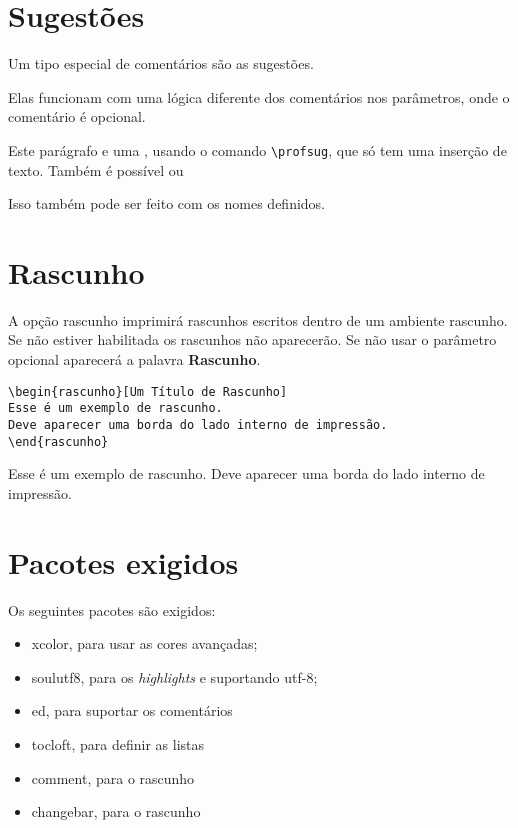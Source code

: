 \documentclass{article}
\begin{document}
\section{Sugestões}

Um tipo especial de comentários são as sugestões.

Elas funcionam com uma lógica diferente dos comentários nos parâmetros, onde o comentário é opcional.

Este parágrafo  e 
uma , usando o comando \verb*|\profsug|, que só tem uma inserção de texto. Também é possível  ou 

Isso também pode ser feito com os nomes definidos. 




\section{Rascunho}

A opção rascunho imprimirá rascunhos escritos dentro de um ambiente rascunho. Se não estiver habilitada os rascunhos não aparecerão. Se não usar o parâmetro opcional aparecerá a palavra \textbf{Rascunho}. 

\begin{verbatim}
\begin{rascunho}[Um Título de Rascunho]
Esse é um exemplo de rascunho. 
Deve aparecer uma borda do lado interno de impressão.
\end{rascunho}
\end{verbatim}

\begin{rascunho}
Esse é um exemplo de rascunho. 
Deve aparecer uma borda do lado interno de impressão.
\end{rascunho}

\section{Pacotes exigidos}

Os seguintes pacotes são exigidos:
\begin{itemize}
    \item xcolor, para usar as cores avançadas;
    \item soulutf8, para os \textit{highlights} e suportando utf-8;
    \item ed, para suportar os comentários
    \item tocloft, para definir as listas 
    \item comment, para o rascunho
    \item changebar, para o rascunho
\end{itemize}
\end{document}
